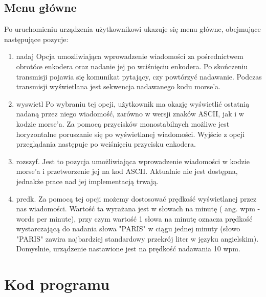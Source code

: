 \documentclass{article}
\begin{document}
\subsection{Menu główne}
Po uruchomieniu urządzenia użytkownikowi ukazuje się menu główne, obejmujące następujące pozycje:

\begin{enumerate}
	\item	nadaj\newline
Opcja umozliwiająca wprowadzenie wiadomości za pośrednictwem obrotóœ enkodera oraz nadanie jej po wciśnięciu enkodera. Po skończeniu transmisji pojawia się komunikat pytający, czy powtórzyć nadawanie. Podczas transmisji wyświetlana jest sekwencja nadawanego kodu morse'a.
	\item	wyswietl\newline
Po wybraniu tej opcji, użytkownik ma okazję wyświetlić ostatnią nadaną przez niego wiadomość, zarówno w wersji znaków ASCII, jak i w kodzie morse'a. Za pomocą przycisków monostabilnych możliwe jest horyzontalne poruszanie się po wyświetlanej wiadomości. Wyjście z opcji przeglądania następuje po wciśnięciu przycisku enkodera.
	\item	rozszyf.\newline
Jest to pozycja umożliwiająca wprowadzenie wiadomości w kodzie morse'a i przetworzenie jej na kod ASCII. Aktualnie nie jest dostępna, jednakże prace nad jej implementacją trwają.
	\item	predk.\newline
Za pomocą tej opcji możemy dostosować prędkość wyświetlanej przez nas wiadomości. Wartość ta wyrażana jest w słowach na minutę ( ang. wpm - words per minute), przy czym wartość 1 słowa na minutę oznacza prędkość wystarczającą do nadania słowa "PARIS" w ciągu jednej minuty (słowo "PARIS" zawira najbardziej standardowy przekrój liter w języku angielskim). Domyslnie, urządzenie nastawione jest na prędkość nadawania 10 wpm.
\end{enumerate}

\section{Kod programu}
\end{document}
